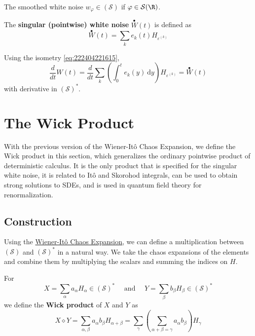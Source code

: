 \begin{example}
The smoothed white noise $w_\varphi \in (\mathcal{S})$ if $\varphi \in \mathcal{S}(\R)$.
\end{example}

\begin{example}
The \textbf{singular (pointwise) white noise} $\stackrel{\bullet}{W}(t)$ is defined as
\[
\stackrel{\bullet}{W}(t) = \sum_k e_k(t) H_{\varepsilon^{(k)}}
\]

Using the isometry \eqref{eq:222404221615}, 
\[
\frac{d}{d t} W(t)=\frac{d}{d t} \sum_k\left(\int_0^t e_k(y) ~\mathrm{d} y\right) H_{\varepsilon^{(k)}}=\stackrel{\bullet}{W}(t)
\]
with derivative in $(\mathcal{S})^*$.

\end{example}

\section{The Wick Product}

With the previous version of the Wiener-Itô Chaos Expansion, we define the Wick product in this section, which generalizes the ordinary pointwise product of deterministic calculus. It is the only product that is specified for the singular white noise, it is related to Itô and Skorohod integrals, can be used to obtain strong solutions to SDEs, and is used in quantum field theory for renormalization.

\subsection*{Construction}

Using the \hyperref[thm:chaos-exp-2]{Wiener-Itô Chaos Expansion}, we can define a multiplication between $(\mathcal{S})$ and $(\mathcal{S})^\ast$ in a natural way. We take the chaos expansions of the elements and combine them by multiplying the scalars and summing the indices on $H$.

\begin{definition}
	For 
	\[
	X = \sum_\alpha a_\alpha H_\alpha \in (\mathcal{S})^\ast  \quad \text{ and } \quad Y = \sum_\beta b_\beta H_\beta \in (\mathcal{S})^\ast
	\]
	we define the \textbf{Wick product} of $X$ and $Y$ as
	\[
	X \diamond Y = \sum_{\alpha, \beta} a_\alpha b_\beta H_{\alpha + \beta} = \sum_{\gamma} \left( \sum_{\alpha + \beta = \gamma} a_\alpha b_\beta \right) H_\gamma
	\]
\end{definition}

